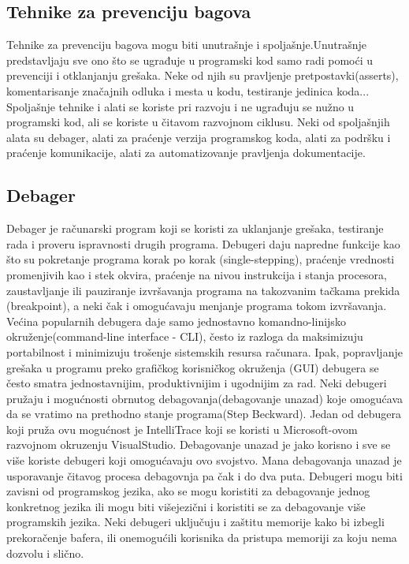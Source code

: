 \documentclass[a4paper]{article}
\begin{document}
\subsection{Tehnike za prevenciju bagova}
\label{subsec:Tehnike za prevenciju bagova}

Tehnike za prevenciju bagova mogu biti unutrašnje i spoljašnje.Unutrašnje predstavljaju sve ono što se ugrađuje u programski kod samo radi pomoći u prevenciji i otklanjanju grešaka. Neke od njih su pravljenje pretpostavki(asserts), komentarisanje značajnih odluka i mesta u kodu, testiranje jedinica koda... Spoljašnje tehnike i alati se koriste pri razvoju i ne ugrađuju se nužno u programski kod, ali se koriste u čitavom razvojnom ciklusu. Neki od spoljašnjih alata su debager, alati za praćenje verzija programskog koda, alati za podršku i praćenje komunikacije, alati za automatizovanje pravljenja dokumentacije\cite{bagovi_smalkov}.

\subsection{Debager}
\label{subsec:Debager}

Debager je računarski program koji se koristi za uklanjanje grešaka, testiranje rada i proveru ispravnosti drugih programa. Debugeri daju napredne funkcije kao što su pokretanje programa korak po korak (single-stepping), praćenje vrednosti promenjivih kao i stek okvira, praćenje na nivou instrukcija i stanja procesora, zaustavljanje ili pauziranje izvršavanja programa na takozvanim tačkama prekida (breakpoint), a neki čak i omogućavaju menjanje programa tokom izvršavanja.\\
\indent Većina popularnih debugera daje samo jednostavno komandno-linijsko okruženje(command-line interface - CLI), često iz razloga da maksimizuju portabilnost i minimizuju trošenje sistemskih resursa računara. Ipak, popravljanje grešaka u programu preko grafičkog korisničkog okruženja (GUI) debugera se često smatra jednostavnijim, produktivnijim i ugodnijim za rad. Neki debugeri pružaju i mogućnosti obrnutog debagovanja(debagovanje unazad) koje omogućava da se vratimo na prethodno stanje programa(Step Beckward). Jedan od debugera koji pruža ovu mogućnost je IntelliTrace koji se koristi u Microsoft-ovom razvojnom okruzenju VisualStudio. Debagovanje unazad je jako korisno i sve se više koriste debugeri koji omogućavaju ovo svojstvo. Mana debagovanja unazad je usporavanje čitavog procesa debagovnja pa čak i do dva puta. Debugeri mogu biti zavisni od programskog jezika, ako se mogu koristiti za debagovanje jednog konkretnog jezika ili mogu biti višejezični i koristiti se za debagovanje više programskih jezika. Neki debugeri uključuju i zaštitu memorije kako bi izbegli prekoračenje bafera, ili onemogućili korisnika da pristupa memoriji za koju nema dozvolu i slično.\cite{ssq_debug_def}
\end{document}
